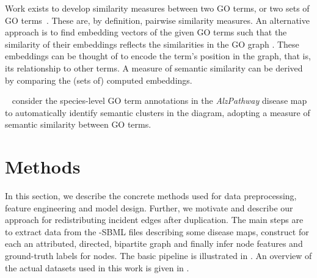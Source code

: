 \documentclass[
	fontsize=10pt, %
	twoside=true, %
	secnumdepth=1, %
  toc=indentunnumbered %
]{kaobook}
\begin{document}
Work exists to develop similarity measures between two GO terms, or two sets of
GO terms~\cite{zhao_GOGOImprovedAlgorithm_2018,
  yu_GOSemSimPackageMeasuring_2010, wang_NewMethodMeasure_2007}. These are, by
definition, pairwise similarity measures. An alternative approach is to find
embedding vectors of the given GO terms such that the similarity of their
embeddings reflects the similarities in the GO graph
\cite{zhong_GO2VecTransformingGO_2020}.
These embeddings can be thought
of to encode the term's position in the graph, that is, its relationship to
other terms. A measure of semantic similarity can be derived by comparing the
(sets of) computed embeddings.


\citeauthor{ostaszewski_ClusteringApproachesVisual_2018}~\cite{ostaszewski_ClusteringApproachesVisual_2018}
consider the species-level GO term annotations in the \textit{AlzPathway}
disease map to automatically identify semantic clusters in the diagram, adopting
a measure of semantic similarity between GO terms.











\chapter{Methods}
\label{sec:methods}

In this section, we describe the concrete methods used for data
preprocessing, feature engineering and model design. Further, we motivate and
describe our approach for redistributing incident edges after duplication.
The main steps are to extract data from the -SBML files
describing some disease maps, construct for each an attributed, directed,
bipartite graph and finally infer node features and ground-truth labels for nodes.
The basic pipeline is illustrated in . An overview of
the actual datasets used in this work is given in .
\end{document}
